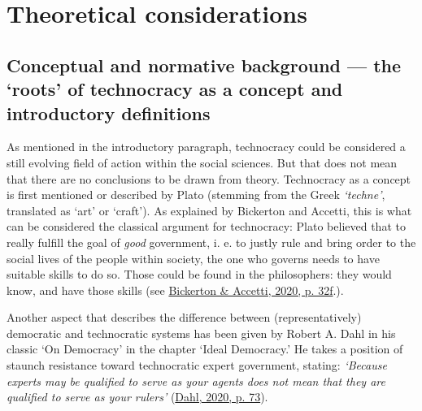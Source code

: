 \documentclass[
  12pt,
  english,
]{article}
\begin{document}
\hypertarget{theoretical-considerations}{%
\section{Theoretical considerations}\label{theoretical-considerations}}

\hypertarget{conceptual-and-normative-background-the-roots-of-technocracy-as-a-concept-and-introductory-definitions}{%
\subsection{Conceptual and normative background --- the `roots' of
technocracy as a concept and introductory
definitions}\label{conceptual-and-normative-background-the-roots-of-technocracy-as-a-concept-and-introductory-definitions}}

As mentioned in the introductory paragraph, technocracy could be
considered a still evolving field of action within the social sciences.
But that does not mean that there are no conclusions to be drawn from
theory. Technocracy as a concept is first mentioned or described by
Plato (stemming from the Greek \emph{`techne'}, translated as `art' or
`craft'). As explained by Bickerton and Accetti, this is what can be
considered the classical argument for technocracy: Plato believed that
to really fulfill the goal of \emph{good} government, i. e. to justly
rule and bring order to the social lives of the people within society,
the one who governs needs to have suitable skills to do so. Those could
be found in the philosophers: they would know, and have those skills
(see \protect\hyperlink{ref-bickerton2020technocracy}{Bickerton \&
Accetti, 2020, p. 32f}.).

Another aspect that describes the difference between (representatively)
democratic and technocratic systems has been given by Robert A. Dahl in
his classic `On Democracy' in the chapter `Ideal Democracy.' He takes a
position of staunch resistance toward technocratic expert government,
stating: \emph{`Because experts may be qualified to serve as your agents
does not mean that they are qualified to serve as your rulers'}
(\protect\hyperlink{ref-dahl_onDemocracy}{Dahl, 2020, p. 73}).
\end{document}
